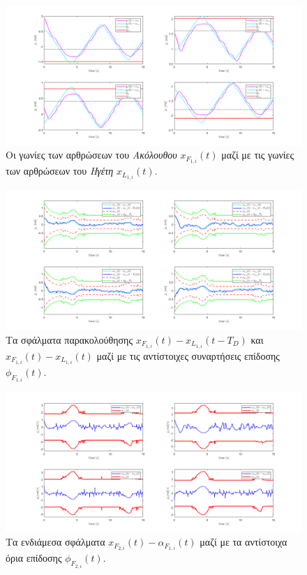 \begin{figure}[H]
    \centering
    \includegraphics[width=1\linewidth]{Chapters/Chapter3/Figures/Sim3Fig2.png}
    \caption{Οι γωνίες των αρθρώσεων του \textit{Ακόλουθου} $x_{F_{1,i}}(t)$ μαζί με τις γωνίες των αρθρώσεων του \textit{Ηγέτη} $x_{L_{1,i}}(t)$.}
    \label{Sim3Fig2}
\end{figure}

\begin{figure}[H]
    \centering
    \includegraphics[width=1\linewidth]{Chapters/Chapter3/Figures/Sim3Fig3.png}
    \caption{Τα σφάλματα παρακολούθησης $x_{F_{1,i}}(t) - x_{L_{1,i}}(t - T_{D})$ και $x_{F_{1,i}}(t) - x_{L_{1,i}}(t)$ μαζί με τις αντίστοιχες συναρτήσεις επίδοσης $\phi_{F_{1,i}}(t)$.}
    \label{Sim3Fig3}
\end{figure}

\begin{figure}[H]
    \centering
    \includegraphics[width=1\linewidth]{Chapters/Chapter3/Figures/Sim3Fig4.png}
    \caption{Τα ενδιάμεσα σφάλματα $x_{F_{2,i}}(t) - \alpha_{F_{1,i}}(t)$ μαζί με τα αντίστοιχα όρια επίδοσης $\phi_{F_{2,i}}(t)$.}
    \label{Sim3Fig4}
\end{figure}

